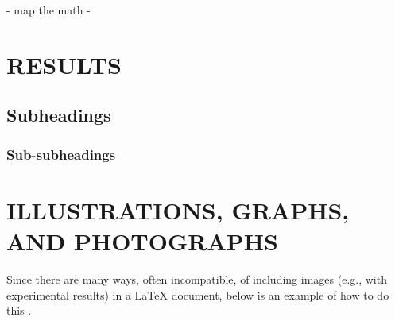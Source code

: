 \documentclass{article}
\begin{document}
- map the math
- 

%
\section{RESULTS}
\label{sec:results}
%


\subsection{Subheadings}
\label{ssec:subhead}

\subsubsection{Sub-subheadings}
\label{sssec:subsubhead}


\section{ILLUSTRATIONS, GRAPHS, AND PHOTOGRAPHS}
\label{sec:illust}

Since there are many ways, often incompatible, of including images (e.g., with
experimental results) in a LaTeX document, below is an example of how to do
this \cite{Lamp86}.
\end{document}
